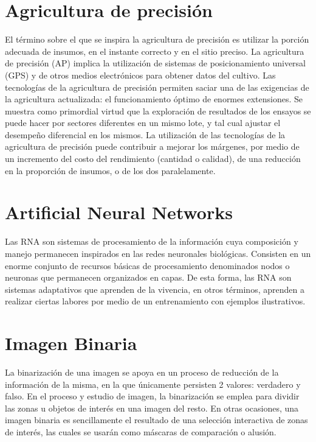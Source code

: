 	\section{Agricultura de precisión} El término sobre el que se inspira la agricultura de precisión es utilizar la porción adecuada de insumos, en el instante correcto y en el sitio preciso. La agricultura de precisión (AP) implica la utilización de sistemas de posicionamiento universal (GPS) y de otros medios electrónicos para obtener datos del cultivo. Las tecnologías de la agricultura de precisión permiten saciar una de las exigencias de la agricultura actualizada: el funcionamiento óptimo de enormes extensiones. Se muestra como primordial virtud que la exploración de resultados de los ensayos se puede hacer por sectores diferentes en un mismo lote, y tal cual ajustar el desempeño diferencial en los mismos. La utilización de las tecnologías de la agricultura de precisión puede contribuir a mejorar los márgenes, por medio de un incremento del costo del rendimiento (cantidad o calidad), de una reducción en la proporción de insumos, o de los dos paralelamente.
	\\
	\section{Artificial Neural Networks} Las RNA son sistemas de procesamiento de la información cuya composición y manejo permanecen inspirados en las redes neuronales biológicas. Consisten en un enorme conjunto de recursos básicas de procesamiento denominados nodos o neuronas que permanecen organizados en capas. De esta forma, las RNA son sistemas adaptativos que aprenden de la vivencia, en otros términos, aprenden a realizar ciertas labores por medio de un entrenamiento con ejemplos ilustrativos.
	\\ 
	
	\section{Imagen Binaria} La binarización de una imagen se apoya en un proceso de reducción de la información de la misma, en la que únicamente persisten 2 valores: verdadero y falso. En el proceso y estudio de imagen, la binarización se emplea para dividir las zonas u objetos de interés en una imagen del resto. En otras ocasiones, una imagen binaria es sencillamente el resultado de una selección interactiva de zonas de interés, las cuales se usarán como máscaras de comparación o alusión.
	\\ 
	
